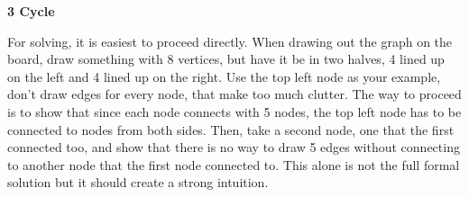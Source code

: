 \item \textbf{3 Cycle} 

For solving, it is easiest to proceed directly. When drawing out the graph on the board, draw something with 8 vertices, but have it be in two halves, 4 lined up on the left and 4 lined up on the right. Use the top left node as your example, don’t draw edges for every node, that make too much clutter. The way to proceed is to show that since each node connects with 5 nodes, the top left node has to be connected to nodes from both sides. Then, take a second node, one that the first connected too, and show that there is no way to draw 5 edges without connecting to another node that the first node connected to. This alone is not the full formal solution but it should create a strong intuition.